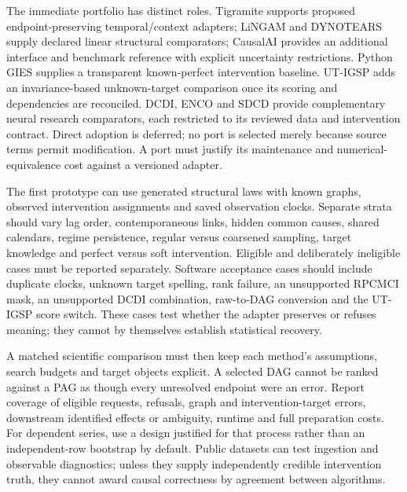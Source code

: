 The immediate portfolio has distinct roles. Tigramite supports proposed
endpoint-preserving temporal/context adapters; LiNGAM and DYNOTEARS supply
declared linear structural comparators; CausalAI provides an additional
interface and benchmark reference with explicit uncertainty restrictions.
Python GIES supplies a transparent known-perfect intervention baseline.
UT-IGSP adds an invariance-based unknown-target comparison once its scoring
and dependencies are reconciled. DCDI, ENCO and SDCD provide complementary
neural research comparators, each restricted to its reviewed data and
intervention contract. Direct adoption is deferred; no port is selected
merely because source terms permit modification. A port must justify its
maintenance and numerical-equivalence cost against a versioned adapter.
\citep{exec14_pt_contract}

The first prototype can use generated structural laws with known graphs,
observed intervention assignments and saved observation clocks. Separate
strata should vary lag order, contemporaneous links, hidden common causes,
shared calendars, regime persistence, regular versus coarsened sampling,
target knowledge and perfect versus soft intervention. Eligible and
deliberately ineligible cases must be reported separately. Software
acceptance cases should include duplicate clocks, unknown target spelling,
rank failure, an unsupported RPCMCI mask, an unsupported DCDI combination,
raw-to-DAG conversion and the UT-IGSP score switch. These cases test whether
the adapter preserves or refuses meaning; they cannot by themselves establish
statistical recovery. \citep{exec14_pt_contract,exec14_pt_exact}

A matched scientific comparison must then keep each method's assumptions,
search budgets and target objects explicit. A selected DAG cannot be ranked
against a PAG as though every unresolved endpoint were an error. Report
coverage of eligible requests, refusals, graph and intervention-target errors,
downstream identified effects or ambiguity, runtime and full preparation
costs. For dependent series, use a design justified for that process rather
than an independent-row bootstrap by default. Public datasets can test
ingestion and observable diagnostics; unless they supply independently
credible intervention truth, they cannot award causal correctness by
agreement between algorithms. \citep{exec14_pt_contract}

